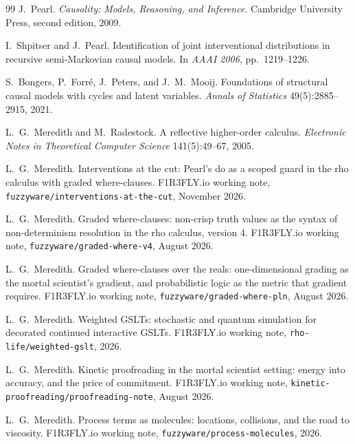 \documentclass[11pt,a4paper]{article}
\theoremstyle{plain}
\theoremstyle{definition}
\theoremstyle{remark}
\begin{document}
\begin{thebibliography}{99}
J.~Pearl.
\newblock \emph{Causality: Models, Reasoning, and Inference}.
\newblock Cambridge University Press, second edition, 2009.

I.~Shpitser and J.~Pearl.
\newblock Identification of joint interventional distributions in recursive
semi-Markovian causal models.
\newblock In \emph{AAAI 2006}, pp.~1219--1226.

S.~Bongers, P.~Forr\'e, J.~Peters, and J.~M.~Mooij.
\newblock Foundations of structural causal models with cycles and latent
variables.
\newblock \emph{Annals of Statistics} 49(5):2885--2915, 2021.

L.~G.~Meredith and M.~Radestock.
\newblock A reflective higher-order calculus.
\newblock \emph{Electronic Notes in Theoretical Computer Science}
141(5):49--67, 2005.

L.~G.~Meredith.
\newblock Interventions at the cut: Pearl's \textsf{do} as a scoped guard in
the rho calculus with graded where-clauses.
\newblock F1R3FLY.io working note,
\texttt{fuzzyware/interventions-at-the-cut}, November 2026.

L.~G.~Meredith.
\newblock Graded where-clauses: non-crisp truth values as the syntax of
non-determinism resolution in the rho calculus, version 4.
\newblock F1R3FLY.io working note, \texttt{fuzzyware/graded-where-v4}, August
2026.

L.~G.~Meredith.
\newblock Graded where-clauses over the reals: one-dimensional grading as the
mortal scientist's gradient, and probabilistic logic as the metric that
gradient requires.
\newblock F1R3FLY.io working note, \texttt{fuzzyware/graded-where-pln}, August
2026.

L.~G.~Meredith.
\newblock Weighted GSLTs: stochastic and quantum simulation for decorated
continued interactive GSLTs.
\newblock F1R3FLY.io working note, \texttt{rho-life/weighted-gslt}, 2026.

L.~G.~Meredith.
\newblock Kinetic proofreading in the mortal scientist setting: energy into
accuracy, and the price of commitment.
\newblock F1R3FLY.io working note,
\texttt{kinetic-proofreading/proofreading-note}, August 2026.

L.~G.~Meredith.
\newblock Process terms as molecules: locations, collisions, and the road to
viscosity.
\newblock F1R3FLY.io working note, \texttt{fuzzyware/process-molecules}, 2026.


\end{thebibliography}
\end{document}

